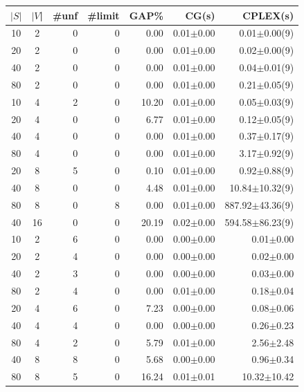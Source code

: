 \documentclass[english]{beamer}
\begin{document}
\begin{frame}
\begin{table}[h]
\begin{center}
\scriptsize
  \begin{tabular}{c c | r r r | r r}
$|S|$ & $|V$| &  \#unf & \#limit &  GAP\%   &  CG(s)        &  CPLEX(s)    \\
\hline
10 & 2     & 0 & 0 &   0.00     &  0.01$\pm$0.00   &  0.01$\pm$0.00(9)        \\
20 & 2     & 0 & 0 &   0.00     &  0.01$\pm$0.00   &  0.02$\pm$0.00(9)        \\
40 & 2     & 0 & 0 &   0.00     &  0.01$\pm$0.00   &  0.04$\pm$0.01(9)        \\
80 & 2     & 0 & 0 &   0.00     &  0.01$\pm$0.00   &  0.21$\pm$0.05(9)        \\
10 & 4     & 2 & 0 &   10.20    &  0.01$\pm$0.00   &  0.05$\pm$0.03(9)        \\
20 & 4     & 0 & 0 &   6.77     &  0.01$\pm$0.00   &  0.12$\pm$0.05(9)        \\
40 & 4     & 0 & 0 &  0.00     &  0.01$\pm$0.00   &  0.37$\pm$0.17(9)        \\
80 & 4     & 0 & 0 &   0.00     &  0.01$\pm$0.00   &  3.17$\pm$0.92(9)        \\
20 & 8     & 5 & 0 &   0.10     &  0.01$\pm$0.00   &  0.92$\pm$0.88(9)        \\
40 & 8     & 0 & 0 &   4.48     &  0.01$\pm$0.00   &  10.84$\pm$10.32(9)      \\
80 & 8     & 0 & 8 &   0.00     &  0.01$\pm$0.00   &  887.92$\pm$43.36(9)     \\
40 & 16   & 0 & 0 &   20.19    &  0.02$\pm$0.00   &  594.58$\pm$86.23(9)    \\
\hline                                                                                          
10 & 2    & 6 & 0 &   0.00      &  0.00$\pm$0.00 &  0.01$\pm$0.00        \\
20 & 2    & 4 & 0 &   0.00      &  0.00$\pm$0.00 &  0.02$\pm$0.00        \\
40 & 2    & 3 & 0 &   0.00      &  0.00$\pm$0.00 &  0.03$\pm$0.00        \\
80 & 2    & 4 & 0 &   0.00      &  0.01$\pm$0.00 &  0.18$\pm$0.04        \\
20 & 4    & 6 & 0 &   7.23      &  0.00$\pm$0.00 &  0.08$\pm$0.06        \\
40 & 4   & 4 & 0  &  0.00      &  0.00$\pm$0.00 &  0.26$\pm$0.23         \\
80 & 4    & 2 & 0 &   5.79      &  0.01$\pm$0.00 &  2.56$\pm$2.48        \\
40 & 8    & 8 & 0 &  5.68       &  0.00$\pm$0.00 &  0.96$\pm$0.34        \\
80 & 8    & 5 & 0 &  16.24      &  0.01$\pm$0.01 &  10.32$\pm$10.42    \\
\end{tabular}
\end{center}
\end{table}
\end{frame}
\end{document}
